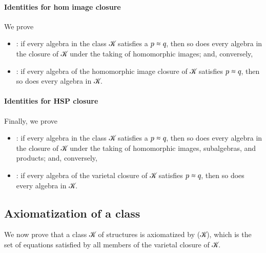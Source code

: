 \documentclass[a4paper,USenglish,cleveref,autoref,thm-restate]{lipics-v2019}
\begin{document}
\paragraph*{Identities for hom image closure}
We prove
\begin{itemize}
\item {}: if every algebra in the class \AB 𝒦 satisfies a 𝑝 ≈ 𝑞, then so does every algebra in the closure  of \AB 𝒦 under the taking of homomorphic images; and, conversely,
\item {}: if every algebra of the homomorphic image closure  of \AB 𝒦 satisfies 𝑝 ≈ 𝑞, then so does every algebra in \AB 𝒦.
\end{itemize}
\begin{code}\end{code}

\paragraph*{Identities for HSP closure}
Finally, we prove
\begin{itemize}
\item {}: if every algebra in the class \AB 𝒦 satisfies a 𝑝 ≈ 𝑞, then so does every algebra in the closure  of \AB 𝒦 under the taking of homomorphic images, subalgebras, and products; and, conversely,
\item {}: if every algebra of the varietal closure  of \AB 𝒦 satisfies 𝑝 ≈ 𝑞, then so does every algebra in \AB 𝒦.
\end{itemize}
\begin{code}\end{code}

\subsection{Axiomatization of a class}\label{sec:axiomatization-of-a-class}
We now prove that a class \AB 𝒦 of structures is axiomatized by \AS (\AS\AB 𝒦), which is the set of equations satisfied by all members of the varietal closure of \AB 𝒦.
\begin{code}\end{code}

\end{document}
